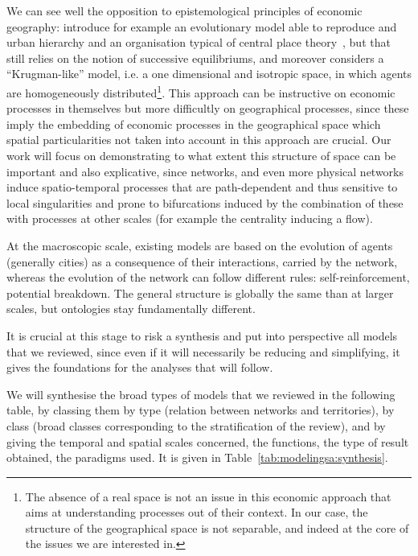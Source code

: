 \documentclass[galley]{jtlu-article-2col}
\begin{document}
We can see well the opposition to epistemological principles of economic geography: \cite{fujita1999evolution} introduce for example an evolutionary model able to reproduce and urban hierarchy and an organisation typical of central place theory~\cite{banos2011christaller}, but that still relies on the notion of successive equilibriums, and moreover considers a ``Krugman-like'' model, i.e. a one dimensional and isotropic space, in which agents are homogeneously distributed\footnote{The absence of a real space is not an issue in this economic approach that aims at understanding processes out of their context. In our case, the structure of the geographical space is not separable, and indeed at the core of the issues we are interested in.}. This approach can be instructive on economic processes in themselves but more difficultly on geographical processes, since these imply the embedding of economic processes in the geographical space which spatial particularities not taken into account in this approach are crucial. Our work will focus on demonstrating to what extent this structure of space can be important and also explicative, since networks, and even more physical networks induce spatio-temporal processes that are path-dependent and thus sensitive to local singularities and prone to bifurcations induced by the combination of these with processes at other scales (for example the centrality inducing a flow).

At the macroscopic scale, existing models are based on the evolution of agents (generally cities) as a consequence of their interactions, carried by the network, whereas the evolution of the network can follow different rules: self-reinforcement, potential breakdown. The general structure is globally the same than at larger scales, but ontologies stay fundamentally different.



It is crucial at this stage to risk a synthesis and put into perspective all models that we reviewed, since even if it will necessarily be reducing and simplifying, it gives the foundations for the analyses that will follow.

We will synthesise the broad types of models that we reviewed in the following table, by classing them by type (relation between networks and territories), by class (broad classes corresponding to the stratification of the review), and by giving the temporal and spatial scales concerned, the functions, the type of result obtained, the paradigms used. It is given in Table~\ref{tab:modelingsa:synthesis}.
\end{document}
